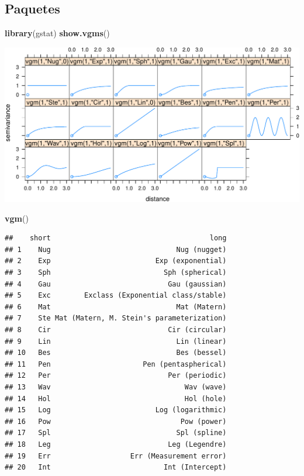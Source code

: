\documentclass[11pt,]{article}
\newenvironment{Shaded}{\begin{snugshade}}{\end{snugshade}}
\newcommand{\KeywordTok}[1]{\textcolor[rgb]{0.13,0.29,0.53}{\textbf{#1}}}
\newcommand{\NormalTok}[1]{#1}
\begin{document}
\subsection{Paquetes}\label{paquetes}

\begin{Shaded}
\begin{Highlighting}[]
\KeywordTok{library}\NormalTok{(gstat)}
\KeywordTok{show.vgms}\NormalTok{()}
\end{Highlighting}
\end{Shaded}

\includegraphics{proyecto_files/figure-latex/variogramas-modelo-1.pdf}

\begin{Shaded}
\begin{Highlighting}[]
\KeywordTok{vgm}\NormalTok{()}
\end{Highlighting}
\end{Shaded}

\begin{verbatim}
##    short                                      long
## 1    Nug                              Nug (nugget)
## 2    Exp                         Exp (exponential)
## 3    Sph                           Sph (spherical)
## 4    Gau                            Gau (gaussian)
## 5    Exc        Exclass (Exponential class/stable)
## 6    Mat                              Mat (Matern)
## 7    Ste Mat (Matern, M. Stein's parameterization)
## 8    Cir                            Cir (circular)
## 9    Lin                              Lin (linear)
## 10   Bes                              Bes (bessel)
## 11   Pen                      Pen (pentaspherical)
## 12   Per                            Per (periodic)
## 13   Wav                                Wav (wave)
## 14   Hol                                Hol (hole)
## 15   Log                         Log (logarithmic)
## 16   Pow                               Pow (power)
## 17   Spl                              Spl (spline)
## 18   Leg                            Leg (Legendre)
## 19   Err                   Err (Measurement error)
## 20   Int                           Int (Intercept)
\end{verbatim}
\end{document}
